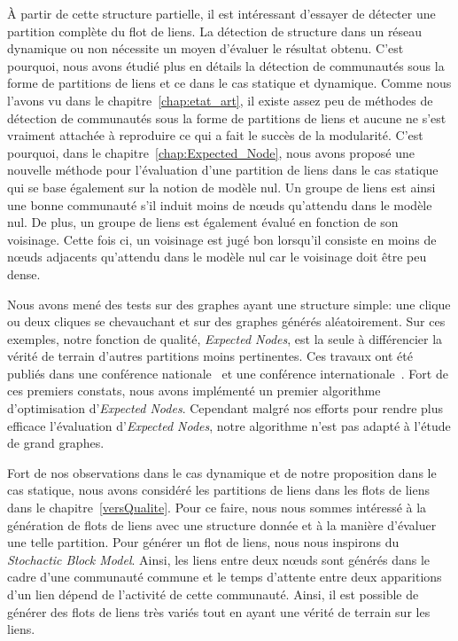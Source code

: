 \bigskip

\`A partir de cette structure partielle, il est intéressant d'essayer de détecter une partition complète du flot de liens.
La détection de structure dans un réseau dynamique ou non nécessite un moyen d'évaluer le résultat obtenu.
C'est pourquoi, nous avons étudié plus en détails la détection de communautés sous la forme de partitions de liens et ce dans le cas statique et dynamique.
Comme nous l'avons vu dans le chapitre~\ref{chap:etat_art}, il existe assez peu de méthodes de détection de communautés sous la forme de partitions de liens et aucune ne s'est vraiment attachée à reproduire ce qui a fait le succès de la modularité.
C'est pourquoi, dans le chapitre~\ref{chap:Expected_Node}, nous avons proposé une nouvelle méthode pour l'évaluation d'une partition de liens dans le cas statique qui se base également sur la notion de modèle nul.
Un groupe de liens est ainsi une bonne communauté s'il induit moins de n\oe uds qu'attendu dans le modèle nul.
De plus, un groupe de liens est également évalué en fonction de son voisinage.
Cette fois ci, un voisinage est jugé bon lorsqu'il consiste en moins de n\oe uds adjacents qu'attendu dans le modèle nul car le voisinage doit être peu dense.

Nous avons mené des tests sur des graphes ayant une structure simple: une clique ou deux cliques se chevauchant et sur des graphes générés aléatoirement.
Sur ces exemples, notre fonction de qualité, \emph{Expected Nodes}, est la seule à différencier la vérité de terrain d'autres partitions moins pertinentes.
Ces travaux ont été publiés dans une conférence nationale~\cite{Gaumont2014} et une conférence internationale~\cite{Gaumont2015}.
Fort de ces premiers constats, nous avons implémenté un premier algorithme d'optimisation d'\emph{Expected Nodes}.
Cependant malgré nos efforts pour rendre plus efficace l'évaluation d'\emph{Expected Nodes}, notre algorithme n'est pas adapté à l'étude de grand graphes.

\bigskip

Fort de nos observations dans le cas dynamique et de notre proposition dans le cas statique, nous avons considéré les partitions de liens dans les flots de liens dans le chapitre~\ref{versQualite}.
Pour ce faire, nous nous sommes intéressé à la génération de flots de liens avec une structure donnée et à la manière d'évaluer une telle partition.
Pour générer un flot de liens, nous nous inspirons du \emph{Stochactic Block Model}.
Ainsi, les liens entre deux n\oe uds sont générés dans le cadre d'une communauté commune et le temps d'attente entre deux apparitions d'un lien dépend de l'activité de cette communauté.
Ainsi, il est possible de générer des flots de liens très variés tout en ayant une vérité de terrain sur les liens.

